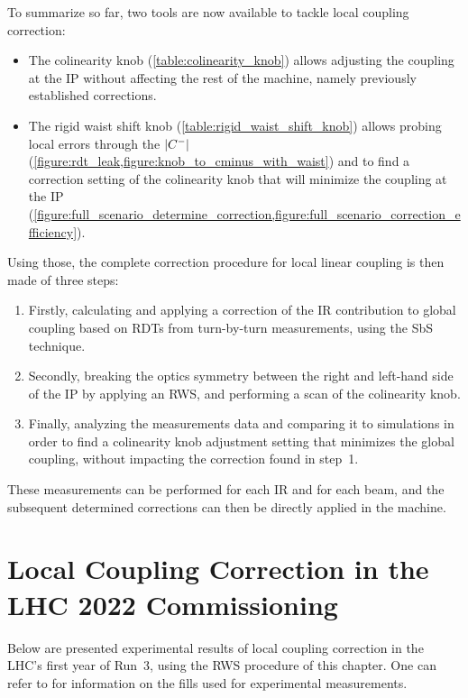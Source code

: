 To summarize so far, two tools are now available to tackle local coupling correction:
\begin{itemize}
    \item The colinearity knob (\cref{table:colinearity_knob}) allows adjusting the coupling at the IP without affecting the rest of the machine, namely previously established corrections.
    \item The rigid waist shift knob (\cref{table:rigid_waist_shift_knob}) allows probing local errors through the \(\left\lvert C^{-} \right\rvert\) (\cref{figure:rdt_leak,figure:knob_to_cminus_with_waist}) and to find a correction setting of the colinearity knob that will minimize the coupling at the IP (\cref{figure:full_scenario_determine_correction,figure:full_scenario_correction_efficiency}).
\end{itemize}

Using those, the complete correction procedure for local linear coupling is then made of three steps:
\begin{enumerate}
    \item Firstly, calculating and applying a correction of the IR contribution to global coupling based on RDTs from turn-by-turn measurements, using the SbS technique.
    \item Secondly, breaking the optics symmetry between the right and left-hand side of the IP by applying an RWS, and performing a scan of the colinearity knob.
    \item Finally, analyzing the measurements data and comparing it to simulations in order to find a colinearity knob adjustment setting that minimizes the global coupling, without impacting the correction found in step~\num{1}.
\end{enumerate}

These measurements can be performed for each IR and for each beam, and the subsequent determined corrections can then be directly applied in the machine.

\section{Local Coupling Correction in the LHC 2022 Commissioning}
\label{section:rws_experimental_results}

Below are presented experimental results of local coupling correction in the LHC's first year of Run~\num{3}, using the RWS procedure of this chapter.
One can refer to  for information on the fills used for experimental measurements.

